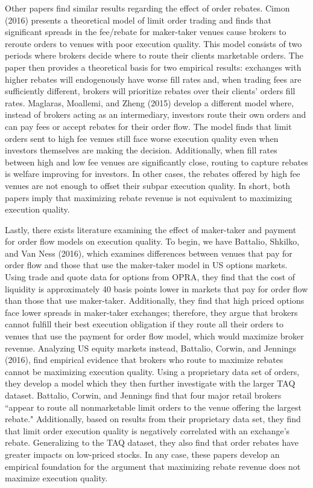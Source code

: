 \documentclass[12pt,a4paper]{article}
\begin{document}
Other papers find similar results regarding the effect of order rebates. Cimon (2016) presents a theoretical model of limit order trading and finds that significant spreads in the fee/rebate for maker-taker venues cause brokers to reroute orders to venues with poor execution quality. This model consists of two periods where brokers decide where to route their clients marketable orders. The paper then provides a theoretical basis for two empirical results: exchanges with higher rebates will endogenously have worse fill rates and, when trading fees are sufficiently different, brokers will prioritize rebates over their clients' orders fill rates. Maglaras, Moallemi, and Zheng (2015) develop a different model where, instead of brokers acting as an intermediary, investors route their own orders and can pay fees or accept rebates for their order flow. The model finds that limit orders sent to high fee venues still face worse execution quality even when investors themselves are making the decision. Additionally, when fill rates between high and low fee venues are significantly close, routing to capture rebates is welfare improving for investors. In other cases, the rebates offered by high fee venues are not enough to offset their subpar execution quality. In short, both papers imply that maximizing rebate revenue is not equivalent to maximizing execution quality. 

Lastly, there exists literature examining the effect of maker-taker and payment for order flow models on execution quality. To begin, we have Battalio, Shkilko, and Van Ness (2016), which examines differences between venues that pay for order flow and those that use the maker-taker model in US options markets. Using trade and quote data for options from OPRA, they find that the cost of liquidity is approximately 40 basis points lower in markets that pay for order flow than those that use maker-taker. Additionally, they find that high priced options face lower spreads in maker-taker exchanges; therefore, they argue that brokers cannot fulfill their best execution obligation if they route all their orders to venues that use the payment for order flow model, which would maximize broker revenue. Analyzing US equity markets instead, Battalio, Corwin, and Jennings (2016), find empirical evidence that brokers who route to maximize rebates cannot be maximizing execution quality. Using a proprietary data set of orders, they develop a model which they then further investigate with the larger TAQ dataset. Battalio, Corwin, and Jennings find that four major retail brokers ``appear to route all nonmarketable limit orders to the venue offering the largest rebate." Additionally, based on results from their proprietary data set, they find that limit order execution quality is negatively correlated with an exchange's rebate. Generalizing to the TAQ dataset, they also find that order rebates have greater impacts on low-priced stocks. In any case, these papers develop an empirical foundation for the argument that maximizing rebate revenue does not maximize execution quality. 
\end{document}
